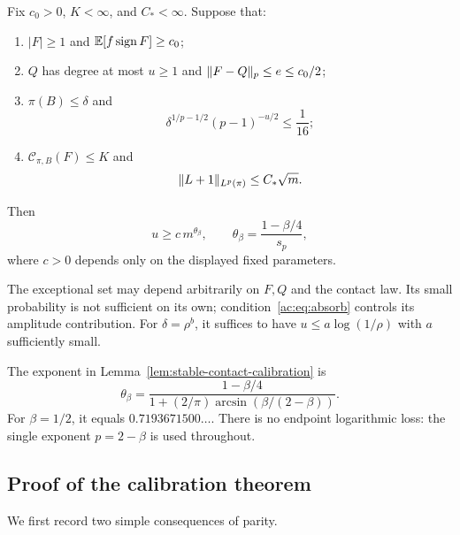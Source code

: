 \begin{lemma}\label{lem:stable-contact-calibration}
Fix $c_0>0$, $K<\infty$, and $C_*<\infty$. Suppose that:
\begin{enumerate}
\item $|F|\ge1$ and $\mathbb E[f\operatorname{sign} F]\ge c_0$;
\item $Q$ has degree at most $u\ge1$ and $\lVert F-Q\rVert_{p}\le e\le c_0/2$;
\item $\pi(B)\le\delta$ and
\begin{equation}\label{ac:eq:absorb}
 \delta^{1/p-1/2}(p-1)^{-u/2}\le\frac1{16};
\end{equation}
\item $\mathcal C_{\pi,B}(F)\le K$ and
\begin{equation}\label{ac:eq:distance}
 \lVert L+1\rVert_{L^p(\pi)}\le C_*\sqrt m.
\end{equation}
\end{enumerate}
Then
\begin{equation}\label{ac:eq:theta}
 u\ge c\,m^{\theta_\beta},\qquad
 \theta_\beta=\frac{1-\beta/4}{s_p},
\end{equation}
where $c>0$ depends only on the displayed fixed parameters.
\end{lemma}

The exceptional set may depend arbitrarily on $F,Q$ and the contact law. Its small probability is not sufficient on its own; condition~\eqref{ac:eq:absorb} controls its amplitude contribution. For $\delta=\rho^b$, it suffices to have $u\le a\log(1/\rho)$ with $a$ sufficiently small.

\begin{theorem}\label{thm:endpoint-contact-calibration}
The exponent in Lemma~\ref{lem:stable-contact-calibration} is
\begin{equation}\label{ac:eq:endpoint}
 \theta_\beta=\frac{1-\beta/4}
 {1+(2/\pi)\arcsin(\beta/(2-\beta))}.
\end{equation}
For $\beta=1/2$, it equals $0.7193671500\ldots$. There is no endpoint logarithmic loss: the single exponent $p=2-\beta$ is used throughout.
\end{theorem}

\subsection{Proof of the calibration theorem}
We first record two simple consequences of parity.

